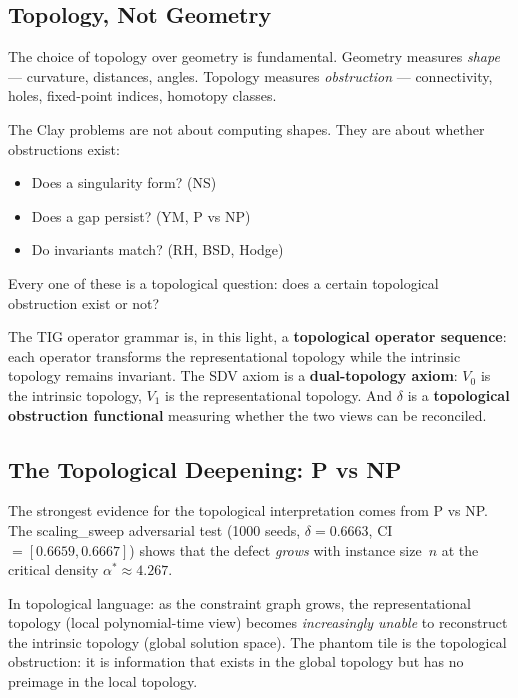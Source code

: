 \documentclass[11pt]{article}
\begin{document}
\subsection{Topology, Not Geometry}
\label{subsec:why-topology}

The choice of topology over geometry is fundamental.  Geometry measures
\emph{shape} --- curvature, distances, angles.  Topology measures
\emph{obstruction} --- connectivity, holes, fixed-point indices, homotopy
classes.

The Clay problems are not about computing shapes.  They are about whether
obstructions exist:
\begin{itemize}
\item Does a singularity form?  (NS)
\item Does a gap persist?  (YM, P vs NP)
\item Do invariants match?  (RH, BSD, Hodge)
\end{itemize}
Every one of these is a topological question: does a certain topological
obstruction exist or not?

The TIG operator grammar is, in this light, a \textbf{topological operator
sequence}: each operator transforms the representational topology while
the intrinsic topology remains invariant.  The SDV axiom is a
\textbf{dual-topology axiom}: $V_0$ is the intrinsic topology, $V_1$ is
the representational topology.  And $\delta$ is a \textbf{topological
obstruction functional} measuring whether the two views can be reconciled.

\subsection{The Topological Deepening: P vs NP}
\label{subsec:topo-pvsnp}

The strongest evidence for the topological interpretation comes from
P vs NP.  The scaling\_sweep adversarial test (1000 seeds, $\delta = 0.6663$,
CI $= [0.6659, 0.6667]$) shows that the defect \emph{grows} with instance
size~$n$ at the critical density $\alpha^* \approx 4.267$.

In topological language: as the constraint graph grows, the representational
topology (local polynomial-time view) becomes \emph{increasingly unable}
to reconstruct the intrinsic topology (global solution space).  The phantom
tile is the topological obstruction: it is information that exists in the
global topology but has no preimage in the local topology.
\end{document}
